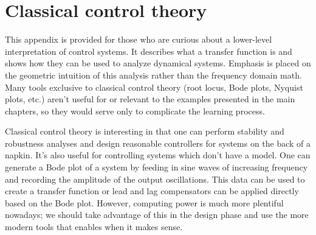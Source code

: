 
\chapter{Classical control theory}

This appendix is provided for those who are curious about a lower-level
interpretation of control systems. It describes what a transfer function is and
shows how they can be used to analyze dynamical systems. Emphasis is placed on
the geometric intuition of this analysis rather than the frequency domain math.
Many tools exclusive to classical control theory (root locus, Bode plots,
Nyquist plots, etc.) aren't useful for or relevant to the examples presented in
the main chapters, so they would serve only to complicate the learning process.

Classical control theory is interesting in that one can perform stability and
robustness analyses and design reasonable controllers for systems on the back of
a napkin. It's also useful for controlling systems which don't have a model. One
can generate a Bode plot of a system by feeding in sine waves of increasing
frequency and recording the amplitude of the output oscillations. This data can
be used to create a transfer function or lead and lag compensators can be
applied directly based on the Bode plot. However, computing power is much more
plentiful nowadays; we should take advantage of this in the design phase and use
the more modern tools that enables when it makes sense.

\renewcommand*{\chapterpath}{\partpath/classical-control-theory}





